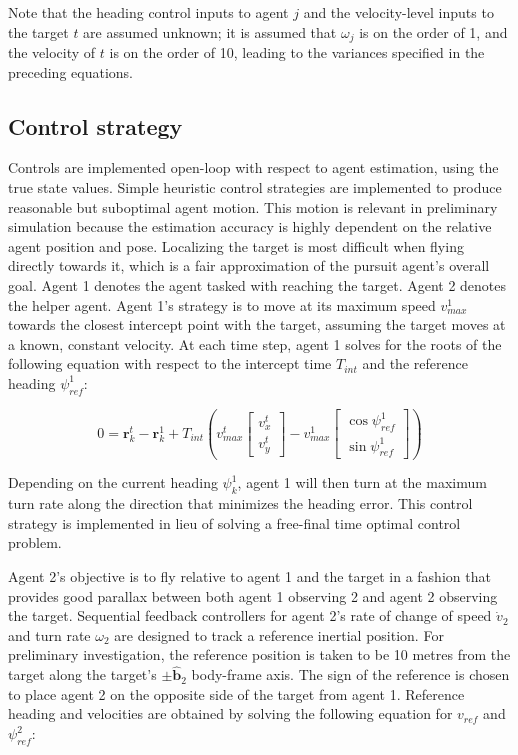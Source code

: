 \documentclass{aiaa-tc}
\newcommand{\B}[1]{\textbf{#1}} %
\newcommand{\U}[1]{\hat{\textbf{#1}}} %
\begin{document}
Note that the heading control inputs to agent $j$ and the velocity-level inputs to the target $t$ are assumed unknown; it is assumed that $\omega_j$ is on the order of 1, and the velocity of $t$ is on the order of 10, leading to the variances specified in the preceding equations.

\subsection{Control strategy}

Controls are implemented open-loop with respect to agent estimation, using the true state values. Simple heuristic control strategies are implemented to produce reasonable but suboptimal agent motion. This motion is relevant in preliminary simulation because the estimation accuracy is highly dependent on the relative agent position and pose. Localizing the target is most difficult when flying directly towards it, which is a fair approximation of the pursuit agent's overall goal. Agent 1 denotes the agent tasked with reaching the target. Agent 2 denotes the helper agent. Agent 1's strategy is to move at its maximum speed $v^1_{max}$ towards the closest intercept point with the target, assuming the target moves at a known, constant velocity. At each time step, agent 1 solves for the roots of the following equation with respect to the intercept time $T_{int}$ and the reference heading $\psi_{ref}^1$:

\begin{equation}
0=\B{r}^t_k - \B{r}^1_k + T_{int}(v^t_{max} \begin{bmatrix}
v_x^t \\
v_y^t
\end{bmatrix} - v^1_{max} \begin{bmatrix}
\cos{\psi^1_{ref}}\\
\sin{\psi^1_{ref}}
\end{bmatrix})
\end{equation}

Depending on the current heading $\psi^1_k$, agent 1 will then turn at the maximum turn rate along the direction that minimizes the heading error. This control strategy is implemented in lieu of solving a free-final time optimal control problem.

Agent 2's objective is to fly relative to agent 1 and the target in a fashion that provides good parallax between both agent 1 observing 2 and agent 2 observing the target. Sequential feedback controllers for agent 2's rate of change of speed $\dot{v}_2$ and turn rate $\omega_2$ are designed to track a reference inertial position. For preliminary investigation, the reference position is taken to be 10 metres from the target along the target's $\pm \U{b}_2$ body-frame axis. The sign of the reference is chosen to place agent 2 on the opposite side of the target from agent 1. Reference heading and velocities are obtained by solving the following equation for $v_{ref}$ and $\psi^2_{ref}$:
\end{document}
